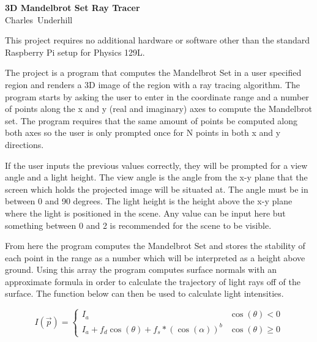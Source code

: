 \documentclass[12pt]{article}
\newcommand\thisis{3D Mandelbrot Set Ray Tracer}
\newcommand\theauthor{Charles~Underhill}
\begin{document}
\thispagestyle{firstpg}

\noindent
{\sffamily\bfseries\huge \thisis}\\

\noindent
{\large\sffamily \theauthor}

\vspace*{20bp}

\indent
This project requires no additional hardware or software other 
than the standard Raspberry Pi setup for Physics 129L. 

\vspace*{10bp}
\indent
The project is a program that computes the Mandelbrot Set in a 
user specified region and renders a 3D image of the region with 
a ray tracing algorithm. The program starts by asking the user 
to enter in the coordinate range and a number of points along 
the x and y (real and imaginary) axes to compute the Mandelbrot 
set. The program requires that the same amount of points be 
computed along both axes so the user is only prompted once for 
N points in both x and y directions. 

\vspace*{10bp}

\indent
If the user inputs the previous values correctly, they will be 
prompted for a view angle and a light height. The view angle is 
the angle from the x-y plane that the screen which holds the 
projected image will be situated at. The angle must be in between 
0 and 90 degrees. The light height is the height above the x-y 
plane where the light is positioned in the scene. Any value can 
be input here but something between 0 and 2 is recommended for 
the scene to be visible. 

\vspace*{10bp}

\indent
From here the program computes the Mandelbrot Set and stores the 
stability of each point in the range as a number which will be 
interpreted as a height above ground. Using this array the program 
computes surface normals with an approximate formula in order to 
calculate the trajectory of light rays off of the surface. The 
function below can then be used to calculate light intensities.

   \[ I(\vec{p}) = \begin{cases}
      I_a & \cos(\theta) < 0 \\
      I_a + f_d\cos(\theta) + f_s * (\cos(\alpha))^b & \cos(\theta) \geq 0
   \end{cases}
   \]
\end{document}
